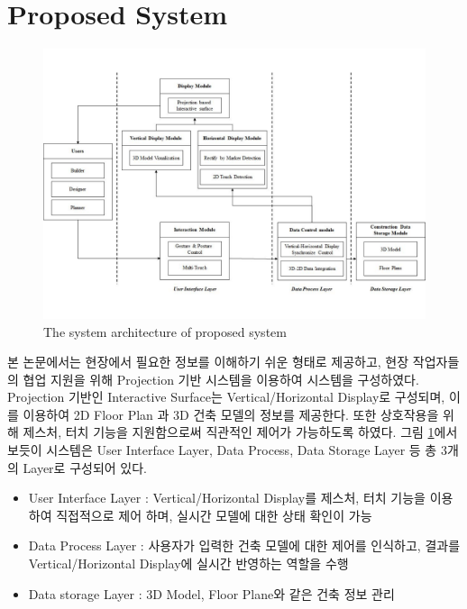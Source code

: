 
\section{Proposed System}

\begin{figure}[ht!]
	\centering
    \includegraphics[width=\textwidth]{3-System/architecture_}
	\caption{The system architecture of proposed system}
    \label{fig:architecture}
\end{figure}

본 논문에서는 현장에서 필요한 정보를 이해하기 쉬운 형태로 제공하고, 현장 작업자들의 협업 지원을 위해 Projection 기반 시스템을 이용하여 시스템을 구성하였다.  Projection 기반인 Interactive Surface는 Vertical/Horizontal Display로 구성되며, 이를 이용하여 2D Floor Plan 과 3D 건축 모델의 정보를 제공한다. 또한 상호작용을 위해 제스처, 터치 기능을 지원함으로써 직관적인 제어가 가능하도록 하였다. 
그림 \ref{fig:architecture}에서 보듯이 시스템은 User Interface Layer, Data Process, Data Storage Layer 등 총 3개의 Layer로 구성되어 있다. 

\begin{itemize}
\item User Interface Layer : Vertical/Horizontal Display를 제스처, 터치 기능을 이용하여 직접적으로 제어 하며, 실시간 모델에 대한 상태 확인이 가능
\item Data Process Layer : 사용자가 입력한 건축 모델에 대한 제어를 인식하고, 결과를 Vertical/Horizontal Display에 실시간 반영하는 역할을 수행
\item Data storage Layer : 3D Model, Floor Plane와 같은 건축 정보 관리
\end{itemize}

